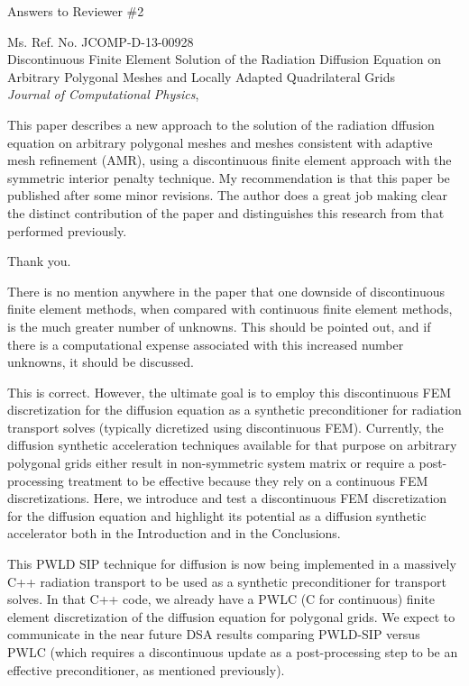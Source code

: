 \documentclass{article}
\begin{document}
\begin{center}
{ \Large Answers to Reviewer \#2}
\end{center}

\bigskip

\noindent Ms. Ref. No. JCOMP-D-13-00928\\
Discontinuous Finite Element Solution of the Radiation Diffusion Equation on Arbitrary Polygonal Meshes and Locally Adapted Quadrilateral Grids\\
{\it Journal of Computational Physics},\\

\bigskip
\bigskip

{
\color{blue}
This paper describes a new approach to the solution of the radiation dffusion
equation on arbitrary polygonal meshes and meshes consistent with adaptive
mesh refinement (AMR), using a discontinuous finite element approach with the
symmetric interior penalty technique. My recommendation is that this paper
be published after some minor revisions. The author does a great job making
clear the distinct contribution of the paper and distinguishes this research from
that performed previously.
}

Thank you.
\bigskip


{
\color{blue}
There is no mention anywhere in the paper that one downside of discontinuous finite element methods, when compared with continuous finite
element methods, is the much greater number of unknowns. This should
be pointed out, and if there is a computational expense associated with
this increased number unknowns, it should be discussed.
}


This is correct. However, the ultimate goal is to employ this discontinuous FEM discretization for the diffusion equation 
as a synthetic preconditioner for radiation transport solves (typically dicretized using discontinuous FEM). Currently, the 
diffusion synthetic acceleration techniques available for that purpose on arbitrary polygonal grids either result in 
non-symmetric system matrix or require a post-processing treatment to be effective because they rely on a continuous FEM discretizations. Here,
we introduce and test a discontinuous FEM discretization for the diffusion equation and highlight its potential as a diffusion synthetic accelerator 
both in the Introduction and in the Conclusions. 

This PWLD SIP technique for diffusion is now being implemented in a massively C++ radiation transport to be used as a 
synthetic preconditioner for transport solves. In that C++ code, we already have a PWLC (C for continuous)
finite element discretization of the diffusion equation for polygonal grids. We expect to communicate in the near
future DSA results comparing PWLD-SIP versus PWLC (which requires a discontinuous update as a post-processing step to
be an effective preconditioner, as mentioned previously).
\end{document}
